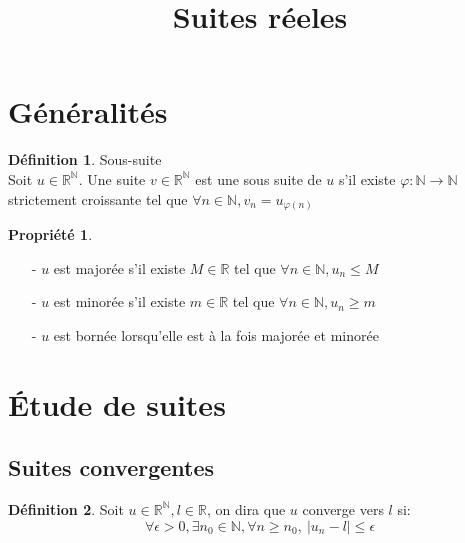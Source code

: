 \documentclass[fleqn]{article}
\title{Suites r\'eeles}
\date{}
\theoremstyle{definition} \newtheorem*{defi}{D\'efinition}
\theoremstyle{definition} \newtheorem*{theo}{Th\'eor\`eme}
\theoremstyle{definition} \newtheorem*{prop}{Propri\'et\'e}
\theoremstyle{definition} \newtheorem*{coro}{Corollaire}
\theoremstyle{remark} \newtheorem*{rqs}{Remarque}
\begin{document}
\maketitle

\section{G\'en\'eralit\'es}
\begin{defi} Sous-suite \\
		Soit $u \in \mathbb{R}^\mathbb{N}$. Une suite $v \in \mathbb{R}^\mathbb{N}$ est une sous suite de $u$ s'il existe
		$\varphi: \mathbb{N} \rightarrow \mathbb{N}$ strictement croissante tel que $\forall n \in \mathbb{N}, v_n = u_{\varphi(n)}$
\end{defi}
\begin{prop} $ $
	\begin{itemize}
		\item [-] $u$ est major\'ee s'il existe $M \in \mathbb{R}$ tel que $\forall n \in \mathbb{N}, u_n \leq M$
		\item [-] $u$ est minor\'ee s'il existe $m \in \mathbb{R}$ tel que $\forall n \in \mathbb{N}, u_n \geq m$
		\item [-] $u$ est born\'ee lorsqu'elle est \`a la fois major\'ee et minor\'ee
	\end{itemize}
\end{prop}

\section{\'Etude de suites}
\subsection{Suites convergentes}
\begin{defi}
	Soit $u \in \mathbb{R}^\mathbb{N}, l \in \mathbb{R}$, on dira que $u$ converge vers $l$ si:
	\[\forall \epsilon > 0, \exists{} n_0 \in \mathbb{N}, \forall n \geq n_0,\ |u_n - l| \leq \epsilon\]
\end{defi}
\end{document}
